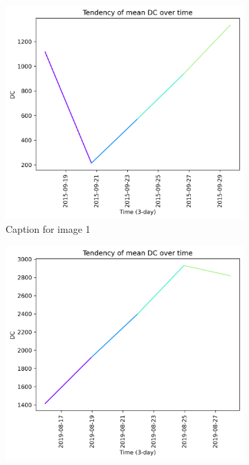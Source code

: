 \begin{figure}[h]
    \centering
    \caption{Caption for the whole figure}
    \begin{subfigure}{0.3\textwidth}
        \centering
        \includegraphics[width=\textwidth]{graphs/2015/15daysprior/2015_15daysprior_tendency_graph_DC.png}
        \caption{Caption for image 1}
        \label{fig:img1}
    \end{subfigure}
    \hfill
    \begin{subfigure}{0.3\textwidth}
        \centering
        \includegraphics[width=\textwidth]{graphs/2019/15daysprior/2019_15daysprior_tendency_graph_DC.png}

\end{subfigure}
\end{figure}

